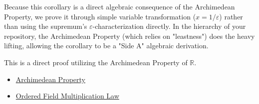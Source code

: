 \begin{remark*}
Because this corollary is a direct algebraic consequence of the Archimedean Property, we prove it through simple variable transformation ($x = 1/\varepsilon$) rather than using the supremum's $\varepsilon$-characterization directly. In the hierarchy of your repository, the Archimedean Property (which relies on "leastness") does the heavy lifting, allowing the corollary to be a "Side A" algebraic derivation.
\end{remark*}

\begin{remark*}
This is a direct proof utilizing the Archimedean Property of $\mathbb{R}$.
\end{remark*}

\begin{dependencies}
\begin{itemize}
  \item \hyperref[thm:archimedean-property]{Archimedean Property}
  \item \hyperref[ax:ordered-field-multiplication-law]{Ordered Field Multiplication Law}
\end{itemize}
\end{dependencies}

\clearpage
